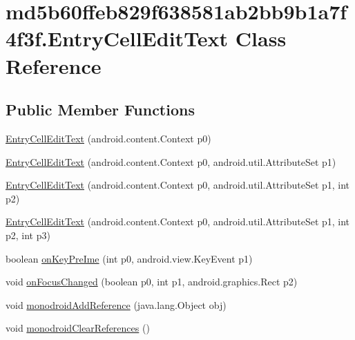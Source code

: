 \hypertarget{classmd5b60ffeb829f638581ab2bb9b1a7f4f3f_1_1_entry_cell_edit_text}{
\section{md5b60ffeb829f638581ab2bb9b1a7f4f3f.EntryCellEditText Class Reference}
\label{classmd5b60ffeb829f638581ab2bb9b1a7f4f3f_1_1_entry_cell_edit_text}
}
\subsection*{Public Member Functions}
\begin{CompactItemize}
\item 
\hyperlink{classmd5b60ffeb829f638581ab2bb9b1a7f4f3f_1_1_entry_cell_edit_text_1f812c4dd4a8466916a56cd524846c26}{EntryCellEditText} (android.content.Context p0)
\item 
\hyperlink{classmd5b60ffeb829f638581ab2bb9b1a7f4f3f_1_1_entry_cell_edit_text_1534671bdcadb40b84028d5077f27748}{EntryCellEditText} (android.content.Context p0, android.util.AttributeSet p1)
\item 
\hyperlink{classmd5b60ffeb829f638581ab2bb9b1a7f4f3f_1_1_entry_cell_edit_text_d9ec4d4eb1721ae9dacee80558ac74bb}{EntryCellEditText} (android.content.Context p0, android.util.AttributeSet p1, int p2)
\item 
\hyperlink{classmd5b60ffeb829f638581ab2bb9b1a7f4f3f_1_1_entry_cell_edit_text_859aeac3b874f8ae9f62a0be2671d9da}{EntryCellEditText} (android.content.Context p0, android.util.AttributeSet p1, int p2, int p3)
\item 
boolean \hyperlink{classmd5b60ffeb829f638581ab2bb9b1a7f4f3f_1_1_entry_cell_edit_text_e1f0f5abfb6ec318b45c3b0e65655095}{onKeyPreIme} (int p0, android.view.KeyEvent p1)
\item 
void \hyperlink{classmd5b60ffeb829f638581ab2bb9b1a7f4f3f_1_1_entry_cell_edit_text_e96ee8d425aa2330f0e03f3e2e42aa1e}{onFocusChanged} (boolean p0, int p1, android.graphics.Rect p2)
\item 
void \hyperlink{classmd5b60ffeb829f638581ab2bb9b1a7f4f3f_1_1_entry_cell_edit_text_c2b60c2aace620dcf6c35e776cc89db4}{monodroidAddReference} (java.lang.Object obj)
\item 
void \hyperlink{classmd5b60ffeb829f638581ab2bb9b1a7f4f3f_1_1_entry_cell_edit_text_3a4945fa7f86ca938cd71b78f446aa32}{monodroidClearReferences} ()
\end{CompactItemize}
